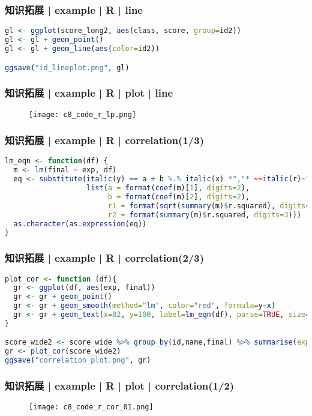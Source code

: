 \begin{frame}[fragile]
  \frametitle{知识拓展 | example | R | line}
\begin{lstlisting}[language=r]
gl <- ggplot(score_long2, aes(class, score, group=id2))
gl <- gl + geom_point()
gl <- gl + geom_line(aes(color=id2))

ggsave("id_lineplot.png", gl)
\end{lstlisting}
\end{frame}

\begin{frame}
  \frametitle{知识拓展 | example | R | plot | line}
  \begin{figure}
    \centering
    \texttt{[image: c8\_code\_r\_lp.png]}
  \end{figure}
\end{frame}

\begin{frame}[fragile]
  \frametitle{知识拓展 | example | R | correlation(1/3)}
\begin{lstlisting}[language=r]
lm_eqn <- function(df) {
  m <- lm(final ~ exp, df)
  eq <- substitute(italic(y) == a + b %.% italic(x) *","* ~~italic(r)~"="~r1 *","* ~~italic(R)^2~"="~r2, 
                   list(a = format(coef(m)[1], digits=2), 
                        b = format(coef(m)[2], digits=2), 
                        r1 = format(sqrt(summary(m)$r.squared), digits=3),
                        r2 = format(summary(m)$r.squared, digits=3)))
  as.character(as.expression(eq))
}
\end{lstlisting}
\end{frame}

\begin{frame}[fragile]
  \frametitle{知识拓展 | example | R | correlation(2/3)}
\begin{lstlisting}[language=r]
plot_cor <- function (df){
  gr <- ggplot(df, aes(exp, final))
  gr <- gr + geom_point()
  gr <- gr + geom_smooth(method="lm", color="red", formula=y~x)
  gr <- gr + geom_text(x=82, y=100, label=lm_eqn(df), parse=TRUE, size=5, color="blue")
}

score_wide2 <- score_wide %>% group_by(id,name,final) %>% summarise(exp=mean(c(e6,e7,e8,e9))) 
gr <- plot_cor(score_wide2)
ggsave("correlation_plot.png", gr)
\end{lstlisting}
\end{frame}

\begin{frame}
  \frametitle{知识拓展 | example | R | plot | correlation(1/2)}
  \begin{figure}
    \centering
    \texttt{[image: c8\_code\_r\_cor\_01.png]}
  \end{figure}
\end{frame}

